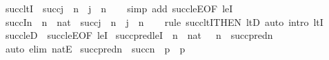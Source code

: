 \begin{isabellebody}
\endisatagproof
{\isafoldproof}%
%
\isadelimproof
\isanewline
%
\endisadelimproof
\isanewline
{}\isamarkupfalse%
\ succ{\isacharunderscore}{\kern0pt}ltI\ {\isacharcolon}{\kern0pt}\ {\isachardoublequoteopen}succ{\isacharparenleft}{\kern0pt}j{\isacharparenright}{\kern0pt}\ {\isacharless}{\kern0pt}\ n\ {\isasymLongrightarrow}\ j\ {\isacharless}{\kern0pt}\ n{\isachardoublequoteclose}\isanewline
%
\isadelimproof
\ \ %
\endisadelimproof
%
\isatagproof
{}\isamarkupfalse%
\ {\isacharparenleft}{\kern0pt}simp\ add{\isacharcolon}{\kern0pt}\ succ{\isacharunderscore}{\kern0pt}leE{\isacharbrackleft}{\kern0pt}OF\ leI{\isacharbrackright}{\kern0pt}{\isacharparenright}{\kern0pt}%
\endisatagproof
{\isafoldproof}%
%
\isadelimproof
\isanewline
%
\endisadelimproof
\isanewline
{}\isamarkupfalse%
\ succ{\isacharunderscore}{\kern0pt}In\ {\isacharcolon}{\kern0pt}\ {\isachardoublequoteopen}n\ {\isasymin}\ nat\ {\isasymLongrightarrow}\ succ{\isacharparenleft}{\kern0pt}j{\isacharparenright}{\kern0pt}\ {\isasymin}\ n\ {\isasymLongrightarrow}\ j\ {\isasymin}\ n{\isachardoublequoteclose}\isanewline
%
\isadelimproof
\ \ %
\endisadelimproof
%
\isatagproof
{}\isamarkupfalse%
\ {\isacharparenleft}{\kern0pt}rule\ succ{\isacharunderscore}{\kern0pt}ltI{\isacharbrackleft}{\kern0pt}THEN\ ltD{\isacharbrackright}{\kern0pt}{\isacharcomma}{\kern0pt}\ auto\ intro{\isacharcolon}{\kern0pt}\ ltI{\isacharparenright}{\kern0pt}%
\endisatagproof
{\isafoldproof}%
%
\isadelimproof
\isanewline
%
\endisadelimproof
\isanewline
{}\isamarkupfalse%
\ succ{\isacharunderscore}{\kern0pt}leD\ {\isacharequal}{\kern0pt}\ succ{\isacharunderscore}{\kern0pt}leE{\isacharbrackleft}{\kern0pt}OF\ leI{\isacharbrackright}{\kern0pt}\isanewline
\isanewline
{}\isamarkupfalse%
\ succpred{\isacharunderscore}{\kern0pt}leI\ {\isacharcolon}{\kern0pt}\ {\isachardoublequoteopen}n\ {\isasymin}\ nat\ {\isasymLongrightarrow}\ \ n\ {\isasymle}\ succ{\isacharparenleft}{\kern0pt}pred{\isacharparenleft}{\kern0pt}n{\isacharparenright}{\kern0pt}{\isacharparenright}{\kern0pt}{\isachardoublequoteclose}\isanewline
%
\isadelimproof
\ \ %
\endisadelimproof
%
\isatagproof
{}\isamarkupfalse%
\ {\isacharparenleft}{\kern0pt}auto\ elim{\isacharcolon}{\kern0pt}\ natE{\isacharparenright}{\kern0pt}%
\endisatagproof
{\isafoldproof}%
%
\isadelimproof
\isanewline
%
\endisadelimproof
\isanewline
{}\isamarkupfalse%
\ succpred{\isacharunderscore}{\kern0pt}n{}\ {\isacharcolon}{\kern0pt}\ {\isachardoublequoteopen}succ{\isacharparenleft}{\kern0pt}n{\isacharparenright}{\kern0pt}\ {\isasymin}\ p\ {\isasymLongrightarrow}\ p{\isasymnoteq}{}{\isachardoublequoteclose}\isanewline

\end{isabellebody}

